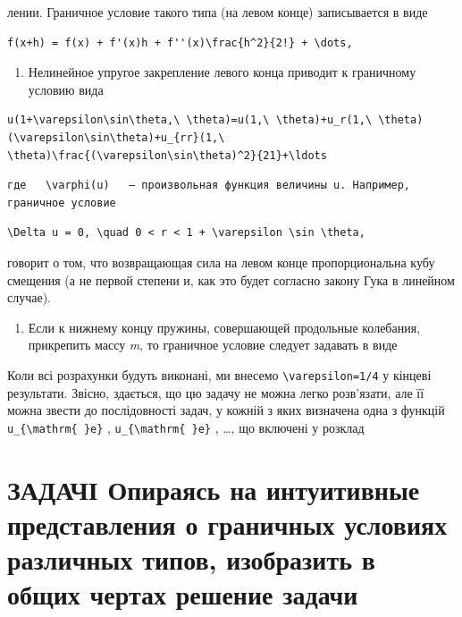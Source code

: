 \documentclass[
  ukrainian,
]{article}
\providecommand{\tightlist}{%
  \setlength{\itemsep}{0pt}\setlength{\parskip}{0pt}}
\begin{document}
лении. Граничное условие такого типа (на левом конце) записывается в
виде

\begin{verbatim}
f(x+h) = f(x) + f'(x)h + f''(x)\frac{h^2}{2!} + \dots,
\end{verbatim}

\begin{enumerate}
\def\labelenumi{\arabic{enumi}.}
\setcounter{enumi}{1}
\tightlist
\item
  Нелинейное упругое закрепление левого конца приводит к граничному
  условию вида
\end{enumerate}

\begin{verbatim}
u(1+\varepsilon\sin\theta,\ \theta)=u(1,\ \theta)+u_r(1,\ \theta)(\varepsilon\sin\theta)+u_{rr}(1,\ \theta)\frac{(\varepsilon\sin\theta)^2}{21}+\ldots
\end{verbatim}

\begin{verbatim}
где   \varphi(u)   — произвольная функция величины u. Например, граничное условие
\end{verbatim}

\begin{verbatim}
\Delta u = 0, \quad 0 < r < 1 + \varepsilon \sin \theta,
\end{verbatim}

говорит о том, что возвращающая сила на левом конце пропорциональна кубу
смещения (а не первой степени и, как это будет согласно закону Гука в
линейном случае).

\begin{enumerate}
\def\labelenumi{\arabic{enumi}.}
\setcounter{enumi}{2}
\tightlist
\item
  Если к нижнему концу пружины, совершающей продольные колебания,
  прикрепить массу \emph{m}, то граничное условие следует задавать в
  виде
\end{enumerate}

Коли всі розрахунки будуть виконані, ми внесемо
\texttt{\textbackslash{}varepsilon=1/4} у кінцеві результати. Звісно,
здається, що цю задачу не можна легко розв'язати, але її можна звести до
послідовності задач, у кожній з яких визначена одна з функцій
\texttt{u\_\{\textbackslash{}mathrm\{\ \}e\}} ,
\texttt{u\_\{\textbackslash{}mathrm\{\ \}e\}} , \ldots, що включені у
розклад

\section{ЗАДАЧІ Опираясь на интуитивные представления о граничных
условиях различных типов, изобразить в общих чертах решение
задачи}\label{ux437ux430ux434ux430ux447ux456-ux43eux43fux438ux440ux430ux44fux441ux44c-ux43dux430-ux438ux43dux442ux443ux438ux442ux438ux432ux43dux44bux435-ux43fux440ux435ux434ux441ux442ux430ux432ux43bux435ux43dux438ux44f-ux43e-ux433ux440ux430ux43dux438ux447ux43dux44bux445-ux443ux441ux43bux43eux432ux438ux44fux445-ux440ux430ux437ux43bux438ux447ux43dux44bux445-ux442ux438ux43fux43eux432-ux438ux437ux43eux431ux440ux430ux437ux438ux442ux44c-ux432-ux43eux431ux449ux438ux445-ux447ux435ux440ux442ux430ux445-ux440ux435ux448ux435ux43dux438ux435-ux437ux430ux434ux430ux447ux438}
\end{document}
